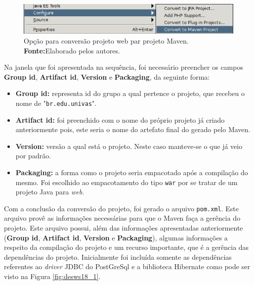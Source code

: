 	\begin{figure}[h!]
		\centerline{\includegraphics[scale=0.8]{./imagens/2_q_metodologico/4_procedimentos_resultados/43_webservice/432_desenvolvimento/desws18.png}}
		\caption[Opção para conversão projeto web par projeto Maven]{Opção para conversão projeto web par projeto Maven.
			\textbf{Fonte:}Elaborado pelos autores.}
		\label{fig:desws18}
	\end{figure}
	
	\par Na janela que foi apresentada na sequência, foi necessário preencher os
campos \textbf{Group id}, \textbf{Artifact id}, \textbf{Version} e
\textbf{Packaging}, da seguinte forma:

	\begin{itemize}
	  \item \textbf{Group id:} representa id do grupo a qual pertence o projeto,
	  que recebeu o nome de "\texttt{br.edu.univas}".
	  \item \textbf{Artifact id:} foi preenchido com o nome do próprio projeto já
	  criado anteriormente pois, este seria o nome do artefato final do gerado pelo
	  Maven.
	  \item \textbf{Version:} versão a qual está o projeto. Neste caso manteve-se
	  o que já veio por padrão.
	  \item \textbf{Packaging:} a forma como o projeto seria empacotado após a
	  compilação do mesmo. Foi escolhido ao empacotamento do tipo \texttt{war} por
	  se tratar de um projeto Java para \textit{web}.
	\end{itemize}
		
	\par Com a conclusão da conversão do projeto, foi gerado o arquivo
\texttt{pom.xml}. Este arquivo provê as informações necessárias para que o Maven
faça a gerência do projeto. Este arquivo possui, além das informações
apresentadas anteriormente (\textbf{Group id}, \textbf{Artifact id},
\textbf{Version} e \textbf{Packaging}), algumas informações a respeito da
compilação do projeto e um recurso importante, que é a gerência das
dependências do projeto. Inicialmente foi incluída somente as dependências
referentes ao \textit{driver} JDBC do PostGreSql e a biblioteca Hibernate como
pode ser visto na Figura \ref{fig:desws18_1}.
	
